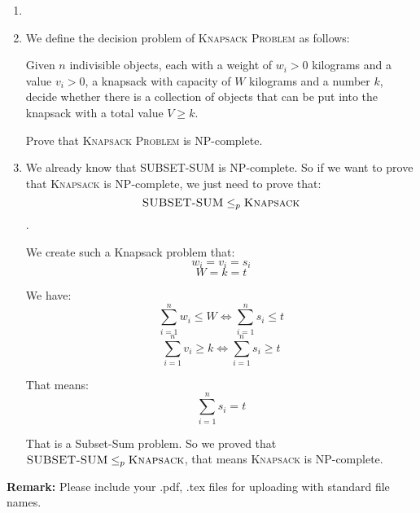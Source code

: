 \documentclass[12pt,a4paper]{article}
\makeatletter
\newtheorem*{solution}{Solution}
\theoremstyle{definition}
\renewenvironment{solution}[1][Solution] {\par\pushQED{\qed}\normalfont\topsep6\p@\@plus6\p@\relax\trivlist\item[\hskip\labelsep\bfseries#1\@addpunct{.}]\ignorespaces}{\popQED\endtrivlist\@endpefalse} \makeatother
\makeatother
\begin{document}
\begin{enumerate}
\begin{solution}
    \end{solution}
    \item We define the decision problem of \textsc{Knapsack Problem} as follows:
    
        Given $n$ indivisible objects, each with a weight of $w_i>0$ kilograms and a value $v_i>0$, a knapsack with capacity of $W$ kilograms and a number $k$, decide whether there is a collection of objects that can be put into the knapsack with a total value $V\geqslant k$.
        
    Prove that \textsc{Knapsack Problem} is NP-complete.
    
    \begin{solution}
        We already know that \textsc{SUBSET-SUM} is NP-complete. So if we want to prove that \textsc{Knapsack} is NP-complete, we just need to prove that:
        $$\textsc{SUBSET-SUM}\leq_p\textsc{Knapsack}$$.

        We create such a Knapsack problem that:
        $$ w_i = v_i = s_i $$
        $$ W = k = t $$

        We have:
        $$ \sum^{n}_{i = 1} w_i \leqslant W \Leftrightarrow \sum^{n}_{i = 1} s_i \leqslant t $$
        $$ \sum^{n}_{i = 1} v_i \geqslant k \Leftrightarrow \sum^{n}_{i = 1} s_i \geqslant t $$

        That means:
        $$ \sum^{n}_{i = 1} s_i = t $$

        That is a Subset-Sum problem. So we proved that $\textsc{SUBSET-SUM}\leq_p\textsc{Knapsack}$, that means \textsc{Knapsack} is NP-complete.



    \end{solution}
\end{enumerate}


\textbf{Remark:} Please include your .pdf, .tex files for uploading with standard file names.
\newpage


\end{document}
